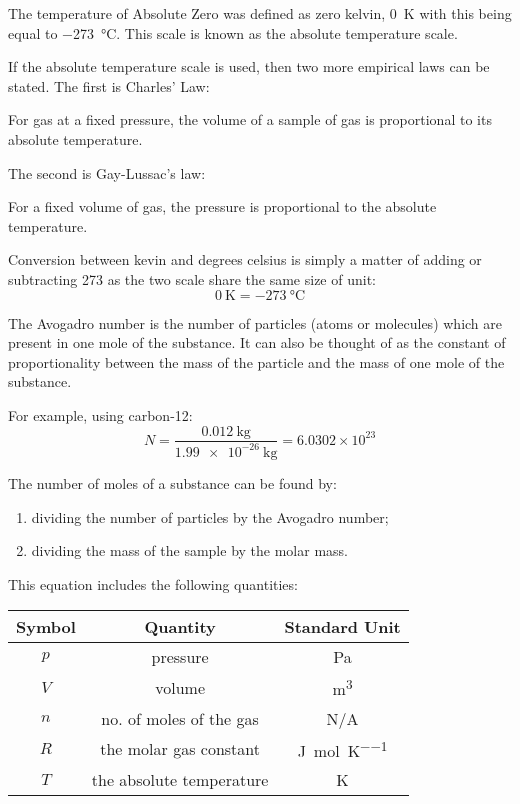 \documentclass[main.tex]{subfiles}
\begin{document}
The temperature of Absolute Zero was defined as zero kelvin, \SI{0}{\kelvin} with this being equal to \SI{-273}{\celsius}. This scale is known as the absolute temperature scale.

If the absolute temperature scale is used, then two more empirical laws can be stated. The first is Charles' Law:

\begin{center}
For gas at a fixed pressure, the volume of a sample of gas is proportional to its absolute temperature.
\end{center}

The second is Gay-Lussac's law:

\begin{center}
For a fixed volume of gas, the pressure is proportional to the absolute temperature.
\end{center}


Conversion between kevin and degrees celsius is simply a matter of adding or subtracting 273 as the two scale share the same size of unit:
$$ \SI{0}{\kelvin} = \SI{-273}{\celsius}$$


The Avogadro number is the number of particles (atoms or molecules) which are present in one mole of the substance. It can also be thought of as the constant of proportionality between the mass of the particle and the mass of one mole of the substance.

For example, using carbon-12:
$$ N = \frac{\SI{0.012}{\kilo\gram}}{\SI{1.99e-26}{\kilo\gram}} = 6.0302\times10^{23}$$

The number of moles of a substance can be found by:
\begin{enumerate}
\item dividing the number of particles by the Avogadro number;
\item dividing the mass of the sample by the molar mass.
\end{enumerate}


This equation includes the following quantities:

\begin{center}\begin{tabular}{ccc}
Symbol & Quantity & Standard Unit \\ \hline
$p$ & pressure & \si{\pascal} \\
$V$ & volume & \si{\metre^3} \\
$n$ & no. of moles of the gas & N/A \\
$R$ & the molar gas constant & \si{\joule\per\mole\per\kelvin} \\
$T$ & the absolute temperature & \si{\kelvin} \\
\end{tabular}\end{center}
\end{document}
